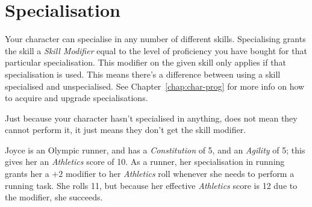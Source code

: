 \section{Specialisation}\label{sec:specialisation}
Your character can specialise in any number of different skills.
Specialising grants the skill a \textit{Skill Modifier} equal to the level of proficiency you have bought for that particular specialisation.
This modifier on the given skill only applies if that specialisation is used.
This means there's a difference between using a skill specialised and unspecialised.
See Chapter~\ref{chap:char-prog} for more info on how to acquire and upgrade specialisations.

\note Just because your character hasn't specialised in anything, does not mean they cannot perform it, it just means they don't get the skill modifier.

\example Joyce is an Olympic runner, and has a \textit{Constitution} of 5, and an \textit{Agility} of 5; this gives her an \textit{Athletics} score of 10. 
As a runner, her specialisation in running grants her a $+2$ modifier to her \textit{Athletics} roll whenever she needs to perform a running task.
She rolls 11, but because her effective \textit{Athletics} score is 12 due to the modifier, she succeeds.